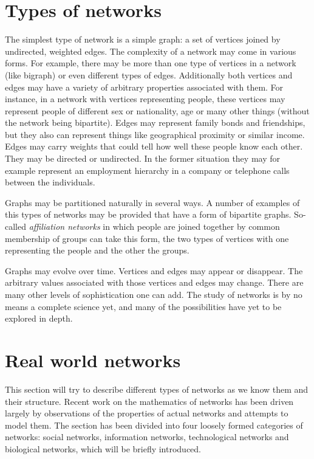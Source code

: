   \section{Types of networks}
    
    The simplest type of network is a simple graph: a set of vertices joined by undirected, weighted edges. The complexity of a network may come in various forms. For example, there may be more than one type of vertices in a network (like bigraph) or even different types of edges. Additionally both vertices and edges may have a variety of arbitrary properties associated with them. For instance, in a network with vertices representing people, these vertices may represent people of different sex or nationality, age or many other things (without the network being bipartite). Edges may represent family bonds and friendships, but they also can represent things like geographical proximity or similar income. Edges may carry weights that could tell how well these people know each other. They may be directed or undirected. In the former situation they may for example represent an employment hierarchy in a company or telephone calls between the individuals.
    
    Graphs may be partitioned naturally in several ways. A number of examples of this types of networks may be provided that have a form of bipartite graphs. So-called \emph{affiliation networks} in which people are joined together by common membership of groups can take this form, the two types of vertices with one representing the people and the other the groups.
    
    Graphs may evolve over time. Vertices and edges may appear or disappear. The arbitrary values associated with those vertices and edges may change. There are many other levels of sophistication one can add. The study of networks is by no means a complete science yet, and many of the possibilities have yet to be explored in depth.

  \section{Real world networks}

    This section will try to describe different types of networks as we know them and their structure. Recent work on the mathematics of networks has been driven largely by observations of the properties of actual networks and attempts to model them. The section has been divided into four loosely formed categories of networks: social networks, information networks, technological networks and biological networks, which will be briefly introduced.

